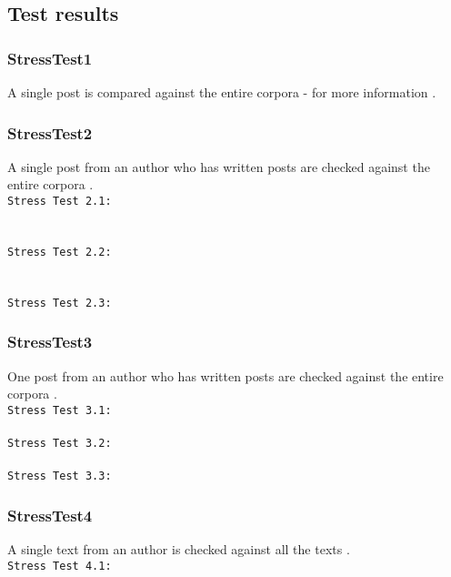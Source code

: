 \begin{description}
\subsection{Test results}

\subsubsection{StressTest1}
A single post is compared against the entire corpora - for more information .\\


\subsubsection{StressTest2}
A single post from an author who has written  posts are checked against the entire corpora .\\
\texttt{Stress Test 2.1:}\\

\\ \\

\texttt{Stress Test 2.2:}\\
\\ \\

\texttt{Stress Test 2.3:}\\


\subsubsection{StressTest3}
One post from an author who has written  posts are checked against the entire corpora .\\
\texttt{Stress Test 3.1:}\\
\\

\texttt{Stress Test 3.2:}\\
\\

\texttt{Stress Test 3.3:}\\


\subsubsection{StressTest4}
A single text from an author is checked against all the texts  .\\
\texttt{Stress Test 4.1:}\\
\\


\end{description}
